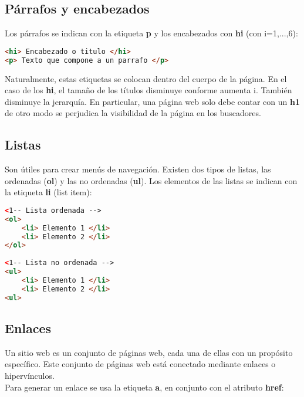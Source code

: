 \documentclass[10pt,oneside]{article}
\begin{document}
\begin{multicols}{2}
\subsection{Párrafos y encabezados}

    Los párrafos se indican con la etiqueta \textbf{p} y los encabezados con \textbf{hi} (con i=1,...,6):
    
    \begin{lstlisting}[language=HTML]
<hi> Encabezado o titulo </hi>        
<p> Texto que compone a un parrafo </p>        
    \end{lstlisting}
    
    Naturalmente, estas etiquetas se colocan dentro del cuerpo de la página. En el caso de los \textbf{hi}, el tamaño de los títulos disminuye conforme aumenta i. También disminuye la jerarquía. En particular, una página web solo debe contar con un \textbf{h1} de otro modo se perjudica la visibilidad de la página en los buscadores. 
    
\subsection{Listas}

    Son útiles para crear menús de navegación. Existen dos tipos de listas, las ordenadas (\textbf{ol}) y las no ordenadas (\textbf{ul}). Los elementos de las listas se indican con la etiqueta \textbf{li} (list item):

    \begin{lstlisting}[language=HTML]
<1-- Lista ordenada -->
<ol> 
    <li> Elemento 1 </li>
    <li> Elemento 2 </li>
</ol> 
    
<1-- Lista no ordenada -->
<ul> 
    <li> Elemento 1 </li>
    <li> Elemento 2 </li>
<ul>        
    \end{lstlisting}
    
\subsection{Enlaces}

    Un sitio web es un conjunto de páginas web, cada una de ellas con un propósito específico. Este conjunto de páginas web está conectado mediante enlaces o hipervínculos. \\ \newline Para generar un enlace se usa la etiqueta \textbf{a}, en conjunto con el atributo \textbf{href}:
    

\end{multicols}
\end{document}
